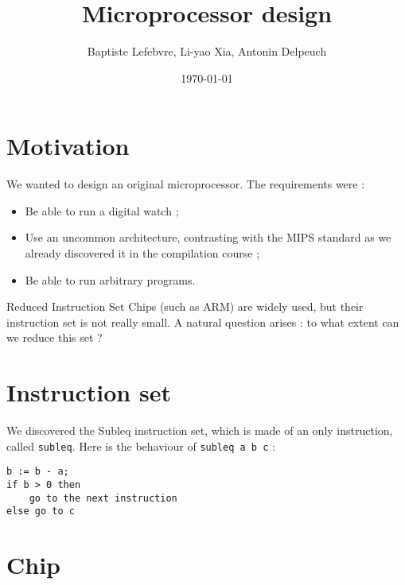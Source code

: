 \documentclass[a4paper]{article}
\begin{document}
\title{Microprocessor design}
\author{Baptiste Lefebvre, Li-yao Xia, Antonin Delpeuch}
\date{\today}

\maketitle

\section{Motivation}

We wanted to design an original microprocessor. The requirements were :
\begin{itemize}
\item Be able to run a digital watch ;
\item Use an uncommon architecture, contrasting with the MIPS standard as we
already discovered it in the compilation course ;
\item Be able to run arbitrary programs.
\end{itemize}

Reduced Instruction Set Chips (such as ARM) are widely used, but their instruction set
is not really small. A natural question arises : to what extent can we
reduce this set ? 

\section{Instruction set}

We discovered the Subleq instruction set, which is made of an only
instruction, called \texttt{subleq}. Here is the behaviour of
\texttt{subleq a b c} :

\begin{verbatim}
b := b - a;
if b > 0 then
    go to the next instruction
else go to c
\end{verbatim}




\section{Chip}
\end{document}
